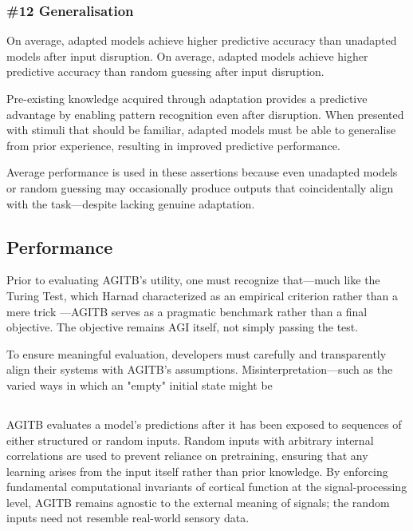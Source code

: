 \documentclass{article}
\newenvironment{two_assertions}[2]
{
  \begin{tabular}{p{1.5cm}p{8.2cm}}
    \textbf{Assertion:} & #1 \\
    \textbf{Assertion:} & #2 \\
}{
  \end{tabular}\\
}
\begin{document}
\subsubsection*{\#12 Generalisation}
\begin{two_assertions}
    {On average, adapted models achieve higher predictive accuracy than unadapted models after input disruption.}
    {On average, adapted models achieve higher predictive accuracy than random guessing after input disruption.}
\end{two_assertions}

Pre-existing knowledge acquired through adaptation provides a predictive advantage by enabling pattern recognition even after disruption. When presented with stimuli that should be familiar, adapted models must be able to generalise from prior experience, resulting in improved predictive performance.

Average performance is used in these assertions because even unadapted models or random guessing may occasionally produce outputs that coincidentally align with the task—despite lacking genuine adaptation.

\subsection{Performance}

Prior to evaluating AGITB’s utility, one must recognize that—much like the Turing Test, which Harnad characterized as an empirical criterion rather than a mere trick \cite{Harnad1992}—AGITB serves as a pragmatic benchmark rather than a final objective. The objective remains AGI itself, not simply passing the test.

To ensure meaningful evaluation, developers must carefully and transparently align their systems with AGITB's assumptions. Misinterpretation—such as the varied ways in which an "empty" initial state might be \subsection{}
AGITB evaluates a model’s predictions after it has been exposed to sequences of either structured or random inputs. Random inputs with arbitrary internal correlations are used to prevent reliance on pretraining, ensuring that any learning arises from the input itself rather than prior knowledge. By enforcing fundamental computational invariants of cortical function at the signal-processing level, AGITB remains agnostic to the external meaning of signals; the random inputs need not resemble real-world sensory data.
\end{document}
